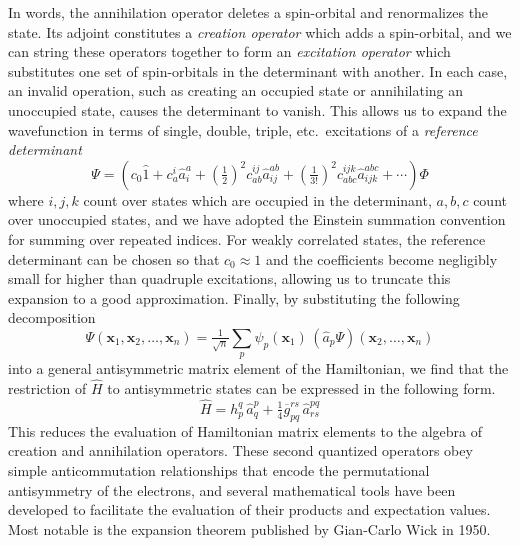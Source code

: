 In words, the annihilation operator deletes a spin-orbital and renormalizes the
state.
Its adjoint constitutes a {\itshape creation operator} which adds a
spin-orbital, and we can string these operators together to form an {\itshape
excitation operator} which substitutes one set of spin-orbitals in the
determinant with another.
In each case, an invalid operation, such as creating an occupied state or
annihilating an unoccupied state, causes the determinant to vanish.
This allows us to expand the wavefunction in terms of single, double, triple,
etc.\ excitations of a {\itshape reference determinant}
\begin{equation}
    \label{eq:intro-ci-expansion}
    \Psi
    =
    \left(
        c_0
        \hat{1}
        +
        c_a^i
        \hat{a}^a_i
        +
        (\tfrac{1}{2})^2
        c_{ab}^{ij}
        \hat{a}^{ab}_{ij}
        +
        (\tfrac{1}{3!})^2
        c_{abc}^{ijk}
        \hat{a}^{abc}_{ijk}
        +
        \cdots
    \right)
    \Phi
\end{equation}
where \(i, j, k\) count over states which are occupied in the determinant, \(a,
b, c\) count over unoccupied states, and we have adopted the Einstein summation
convention for summing over repeated indices.
For weakly correlated states, the reference determinant can be chosen so that
\(c_0 \approx 1\) and the coefficients become negligibly small for higher than
quadruple excitations, allowing us to truncate this expansion to a good
approximation.
Finally, by substituting the following decomposition
\begin{equation}
    \Psi(\mathbf{x}_1, \mathbf{x}_2, \ldots, \mathbf{x}_n)
    =
    \tfrac{1}{\sqrt{n}}
    \sum_p
    \psi_p(\mathbf{x}_1)\,
    (\hat{a}_p\Psi)(\mathbf{x}_2, \ldots, \mathbf{x}_n)
\end{equation}
into a general antisymmetric matrix element of the Hamiltonian, we find that the
restriction of \(\hat{H}\) to antisymmetric states can be expressed in the
following form.
\begin{equation}
    \hat{H}
    =
    h_p^q\,
    \hat{a}^p_q
    +
    \tfrac{1}{4}
    \overline{g}_{pq}^{rs}\,
    \hat{a}^{pq}_{rs}
\end{equation}
This reduces the evaluation of Hamiltonian matrix elements to the algebra of
creation and annihilation operators.
These second quantized operators obey simple anticommutation relationships that
encode the permutational antisymmetry of the electrons, and several mathematical
tools have been developed to facilitate the evaluation of their products and
expectation values.
Most notable is the expansion theorem published by Gian-Carlo Wick in
1950.\cite{Wick:1950p268}


